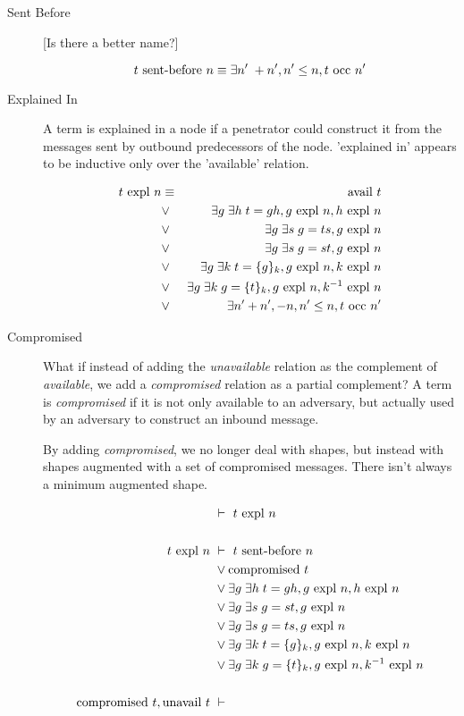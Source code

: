 \documentclass{article}
\begin{document}
\begin{description}
\item[Sent Before]

[Is there a better name?]

$$ t \mbox{ sent-before } n \equiv
   \exists n'\; +n', n' \leq n, t \mbox{ occ } n' $$

\item[Explained In]

A term is explained in a node if a penetrator could construct it from
the messages sent by outbound predecessors of the node.  'explained
in' appears to be inductive only over the 'available' relation.

\begin{eqnarray*}
t \mbox{ expl } n & \equiv & \mbox{avail } t \\
& \vee & \exists g\; \exists h\; t = gh, g \mbox{ expl } n, h \mbox{ expl } n \\
& \vee & \exists g\; \exists s\; g = ts, g \mbox{ expl } n \\
& \vee & \exists g\; \exists s\; g = st, g \mbox{ expl } n \\
& \vee & \exists g\; \exists k\; t = \{g\}_{k}, g \mbox{ expl } n, k \mbox{ expl } n \\
& \vee & \exists g\; \exists k\; g = \{t\}_{k}, g \mbox{ expl } n, k^{-1} \mbox{ expl } n \\
& \vee & \exists n' +n', -n, n' \leq n, t \mbox{ occ } n'
\end{eqnarray*}

\item[Compromised]

What if instead of adding the \emph{unavailable} relation as the
complement of \emph{available}, we add a \emph{compromised} relation
as a partial complement? A term is \emph{compromised} if it is not
only available to an adversary, but actually used by an adversary to
construct an inbound message.

By adding \emph{compromised}, we no longer deal with shapes, but
instead with shapes augmented with a set of compromised
messages. There isn't always a minimum augmented shape.

\begin{align*}
& \ \vdash\ t \mbox{ expl } n \\
\\
t \mbox{ expl } n & \ \vdash\ t \mbox{ sent-before } n \\
    &\ \vee \mbox{compromised } t \\
    &\ \vee \exists g\; \exists h\; t = gh, g \mbox{ expl } n, h \mbox{ expl } n \\
    &\ \vee \exists g\; \exists s\; g = st, g \mbox{ expl } n \\
    &\ \vee \exists g\; \exists s\; g = ts, g \mbox{ expl } n \\
    &\ \vee \exists g\; \exists k\; t = \{g\}_{k}, g \mbox{ expl } n, k \mbox{ expl } n \\
    &\ \vee \exists g\; \exists k\; g = \{t\}_{k}, g \mbox{ expl } n,
k^{-1} \mbox{ expl } n \\
\\
\mbox{compromised } t, \mbox{unavail } t & \ \vdash\ 
\end{align*}

\end{description}
\end{document}

